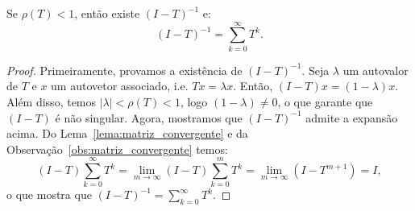 \begin{lem}\label{lema:inversa}
  Se $\rho(T) < 1$, então existe $(I - T)^{-1}$ e:
  \begin{equation*}
    (I - T)^{-1} = \sum_{k=0}^\infty T^k.
  \end{equation*}
\end{lem}
\begin{proof}
  Primeiramente, provamos a existência de $(I - T)^{-1}$. Seja $\lambda$ um autovalor de $T$ e $x$ um autovetor associado, i.e. $Tx = \lambda x$. Então, $(I-T)x = (1-\lambda)x$. Além disso, temos $|\lambda| < \rho(T) < 1$, logo $(1 - \lambda) \neq 0$, o que garante que $(I - T)$ é não singular.
  Agora, mostramos que $(I - T)^{-1}$ admite a expansão acima. Do Lema~\ref{lema:matriz_convergente} e da Observação~\ref{obs:matriz_convergente} temos:
  \begin{equation*}
   (I - T)\sum_{k=0}^\infty T^k =  \lim_{m\to\infty} (I - T)\sum_{k=0}^m T^k = \lim_{m\to\infty} (I - T^{m+1}) = I,
  \end{equation*}
o que mostra que $\displaystyle (I - T)^{-1} = \sum_{k=0}^\infty T^k$.
\end{proof}

